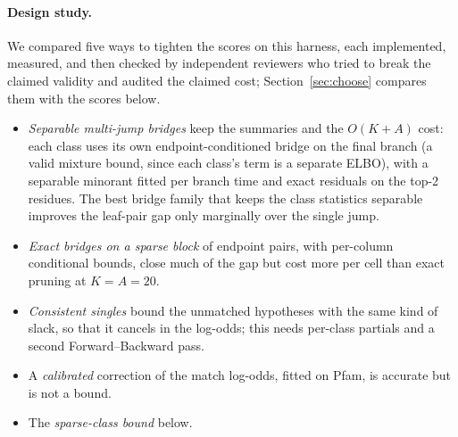 \documentclass[11pt]{article}
\begin{document}
\paragraph{Design study.} We compared five ways to tighten the scores on this
harness, each implemented, measured, and then checked by independent
reviewers who tried to break the claimed validity and audited the claimed cost;
Section~\ref{sec:choose} compares them with the scores below.
\begin{itemize}
\item \emph{Separable multi-jump bridges} keep the summaries and the $O(K+A)$
  cost: each class uses its own endpoint-conditioned bridge on the final branch
  (a valid mixture bound, since each class's term is a separate ELBO), with a
  separable minorant fitted per branch time and exact residuals on the top-2
  residues. The best bridge family that keeps the class statistics separable
  improves the leaf-pair gap only marginally over the single jump.
\item \emph{Exact bridges on a sparse block} of endpoint pairs, with
  per-column conditional bounds, close much of the gap but cost more per cell
  than exact pruning at $K=A=20$.
\item \emph{Consistent singles} bound the unmatched hypotheses with the same
  kind of slack, so that it cancels in the log-odds; this needs per-class
  partials and a second Forward--Backward pass.
\item A \emph{calibrated} correction of the match log-odds, fitted on Pfam, is
  accurate but is not a bound.
\item The \emph{sparse-class bound} below.
\end{itemize}
\end{document}
